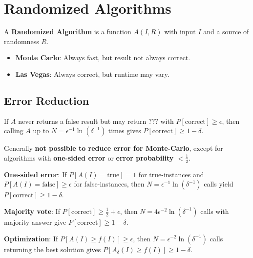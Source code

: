 \section{Randomized Algorithms}

\begin{definition}
	A \textbf{Randomized Algorithm} is a function $A(I, R)$ with input $I$ and a source of randomness $R$.
	\begin{itemize}
		\item \textbf{Monte Carlo}: Always fast, but result not always correct.
		\item \textbf{Las Vegas}: Always correct, but runtime may vary.
	\end{itemize}
\end{definition}

\subsection{Error Reduction}

\begin{theorem}
	If $A$ never returns a false result but may return $???$ with $P[\text{correct}] \geq \epsilon$, then calling $A$ up to $N = \epsilon^{-1} \ln(\delta^{-1})$ times gives $P[\text{correct}] \geq 1 - \delta$.
\end{theorem}

\begin{important}
	Generally \textbf{not possible to reduce error for Monte-Carlo}, except for algorithms with \textbf{one-sided error} or \textbf{error probability $\lt \frac{1}{2}$}.
\end{important}

\begin{theorem}
	\textbf{One-sided error}: If $P[A(I) = \text{true}] = 1$ for true-instances and $P[A(I) = \text{false}] \geq \epsilon$ for false-instances, then $N = \epsilon^{-1} \ln(\delta^{-1})$ calls yield $P[\text{correct}] \geq 1 - \delta$.
\end{theorem}

\begin{theorem}
	\textbf{Majority vote}: If $P[\text{correct}] \geq \frac{1}{2} + \epsilon$, then $N = 4\epsilon^{-2} \ln(\delta^{-1})$ calls with majority answer give $P[\text{correct}] \geq 1 - \delta$.
\end{theorem}

\begin{theorem}
	\textbf{Optimization}: If $P[A(I) \geq f(I)] \geq \epsilon$, then $N = \epsilon^{-2} \ln(\delta^{-1})$ calls returning the best solution gives $P[A_\delta(I) \geq f(I)] \geq 1 - \delta$.
\end{theorem}

